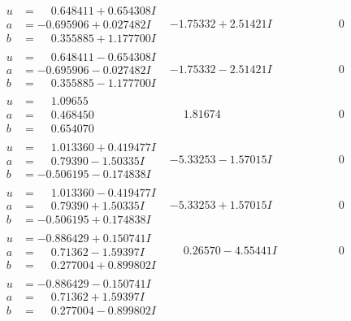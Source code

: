 \documentclass[1p]{elsarticle_modified}
\theoremstyle{definition}
\begin{document}
$$\begin{array}{c|c|c}
\begin{aligned}
u &= \phantom{-}0.648411 + 0.654308 I \\
a &= -0.695906 + 0.027482 I \\
b &= \phantom{-}0.355885 + 1.177700 I\end{aligned}
 & -1.75332 + 2.51421 I & \phantom{-0.000000 } 0 \\ \hline\begin{aligned}
u &= \phantom{-}0.648411 - 0.654308 I \\
a &= -0.695906 - 0.027482 I \\
b &= \phantom{-}0.355885 - 1.177700 I\end{aligned}
 & -1.75332 - 2.51421 I & \phantom{-0.000000 } 0 \\ \hline\begin{aligned}
u &= \phantom{-}1.09655\phantom{ +0.000000I} \\
a &= \phantom{-}0.468450\phantom{ +0.000000I} \\
b &= \phantom{-}0.654070\phantom{ +0.000000I}\end{aligned}
 & \phantom{-}1.81674\phantom{ +0.000000I} & \phantom{-0.000000 } 0 \\ \hline\begin{aligned}
u &= \phantom{-}1.013360 + 0.419477 I \\
a &= \phantom{-}0.79390 - 1.50335 I \\
b &= -0.506195 - 0.174838 I\end{aligned}
 & -5.33253 - 1.57015 I & \phantom{-0.000000 } 0 \\ \hline\begin{aligned}
u &= \phantom{-}1.013360 - 0.419477 I \\
a &= \phantom{-}0.79390 + 1.50335 I \\
b &= -0.506195 + 0.174838 I\end{aligned}
 & -5.33253 + 1.57015 I & \phantom{-0.000000 } 0 \\ \hline\begin{aligned}
u &= -0.886429 + 0.150741 I \\
a &= \phantom{-}0.71362 - 1.59397 I \\
b &= \phantom{-}0.277004 + 0.899802 I\end{aligned}
 & \phantom{-}0.26570 - 4.55441 I & \phantom{-0.000000 } 0 \\ \hline\begin{aligned}
u &= -0.886429 - 0.150741 I \\
a &= \phantom{-}0.71362 + 1.59397 I \\
b &= \phantom{-}0.277004 - 0.899802 I\end{aligned}

\end{array}$$
\end{document}
